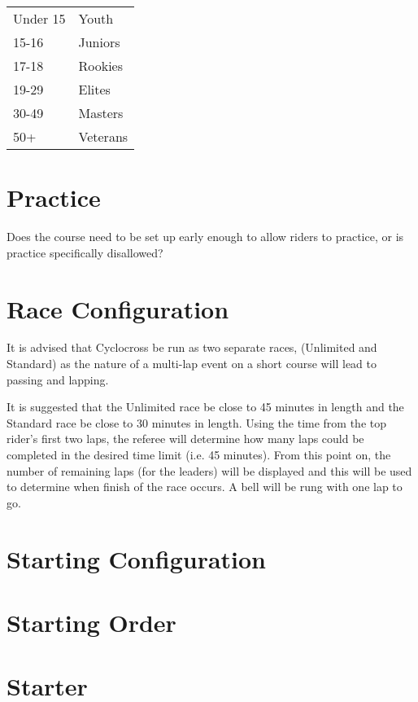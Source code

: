 \begin{tabular}{ l l}
Under 15 & Youth \\
15-16 & Juniors \\
17-18 & Rookies \\
19-29 & Elites \\
30-49 & Masters \\
50+ & Veterans \\
\end{tabular}

\section{Practice}

\begin{framed}
Does the course need to be set up early enough to allow riders to practice, or is practice specifically disallowed?
\end{framed}

\section{Race Configuration}

It is advised that Cyclocross be run as two separate races, (Unlimited and Standard) as the nature of a multi-lap event on a short course will lead to passing and lapping.

It is suggested that the Unlimited race be close to 45 minutes in length and the Standard race be close to 30 minutes in length.
Using the time from the top rider's first two laps, the referee will determine how many laps could be completed in the desired time limit (i.e. 45 minutes).
From this point on, the number of remaining laps (for the leaders) will be displayed and this will be used to determine when finish of the race occurs. A bell will be rung with one lap to go.

\section{Starting Configuration}

\section{Starting Order}

\section{Starter}

